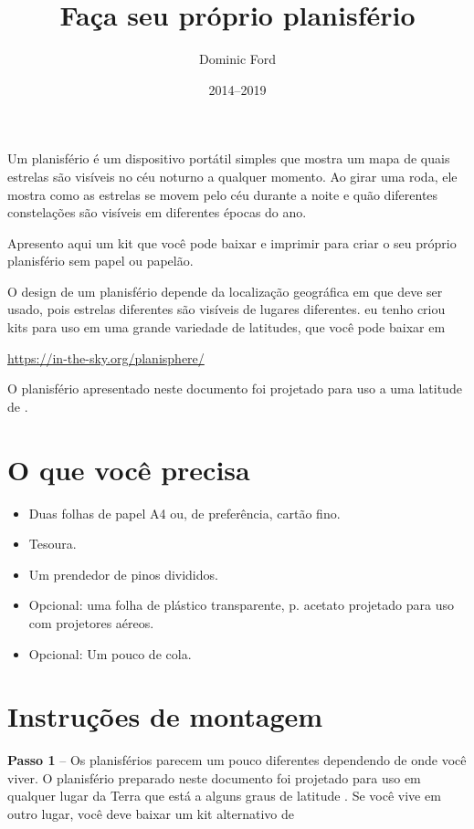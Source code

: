 \documentclass[a4paper,onecolumn,10pt]{article}
\title{Faça seu próprio planisfério}
\author{Dominic Ford}
\date{2014--2019}
\begin{document}
\maketitle
\setcounter{footnote}{1}

Um planisfério é um dispositivo portátil simples que mostra um mapa de quais estrelas 
são visíveis no céu noturno a qualquer momento. Ao girar uma roda, ele mostra
como as estrelas se movem pelo céu durante a noite e quão diferentes
constelações são visíveis em diferentes épocas do ano.

Apresento aqui um kit que você pode baixar e imprimir para criar o seu próprio
planisfério sem papel ou papelão.

O design de um planisfério depende da localização geográfica em que deve
ser usado, pois estrelas diferentes são visíveis de lugares diferentes. eu tenho
criou kits para uso em uma grande variedade de latitudes, que você pode baixar em

\url{https://in-the-sky.org/planisphere/}

O planisfério apresentado neste documento foi projetado para uso a uma latitude de
.
 
\section*{O que você precisa}

\begin{itemize}
\item Duas folhas de papel A4 ou, de preferência, cartão fino.
\item Tesoura.
\item Um prendedor de pinos divididos.
\item Opcional: uma folha de plástico transparente, p. acetato projetado para uso 
com projetores aéreos.
\item Opcional: Um pouco de cola.
\end{itemize}

\section*{Instruções de montagem}

{\bf Passo 1} -- Os planisférios parecem um pouco diferentes dependendo de onde você 
viver. O planisfério preparado neste documento foi projetado para uso em qualquer 
lugar da Terra que está a alguns graus de latitude . Se você vive
em outro lugar, você deve baixar um kit alternativo de
\end{document}
